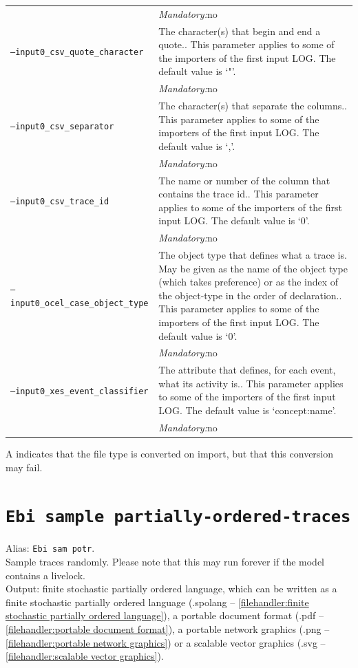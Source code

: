{\begin{tabularx}{\linewidth}{lX}
&\textit{Mandatory:}\quad no\\
\texttt{--input0\_csv\_quote\_character} & The character(s) that begin and end a quote.. This parameter applies to some of the importers of the first input LOG. The default value is `"'.\\
&\textit{Mandatory:}\quad no\\
\texttt{--input0\_csv\_separator} & The character(s) that separate the columns.. This parameter applies to some of the importers of the first input LOG. The default value is `,'.\\
&\textit{Mandatory:}\quad no\\
\texttt{--input0\_csv\_trace\_id} & The name or number of the column that contains the trace id.. This parameter applies to some of the importers of the first input LOG. The default value is `0'.\\
&\textit{Mandatory:}\quad no\\
\texttt{--input0\_ocel\_case\_object\_type} & The object type that defines what a trace is. May be given as the name of the object type (which takes preference) or as the index of the object-type in the order of declaration.. This parameter applies to some of the importers of the first input LOG. The default value is `0'.\\
&\textit{Mandatory:}\quad no\\
\texttt{--input0\_xes\_event\_classifier} & The attribute that defines, for each event, what its activity is.. This parameter applies to some of the importers of the first input LOG. The default value is `concept:name'.\\
&\textit{Mandatory:}\quad no\\
\bottomrule
\end{tabularx}
A \textdagger{} indicates that the file type is converted on import, but that this conversion may fail.
\clearpage\section{\texttt{Ebi sample partially-ordered-traces}}
\label{command:Ebi sample partially-ordered-traces}
Alias: \texttt{Ebi sam potr}.\\
Sample traces randomly. Please note that this may run forever if the model contains a livelock.\\
\noindent Output: finite stochastic partially ordered language, which can be written as a finite stochastic partially ordered language (.spolang -- \cref{filehandler:finite stochastic partially ordered language}), a portable document format (.pdf -- \cref{filehandler:portable document format}), a portable network graphics (.png -- \cref{filehandler:portable network graphics}) or a scalable vector graphics (.svg -- \cref{filehandler:scalable vector graphics}).\\
}
